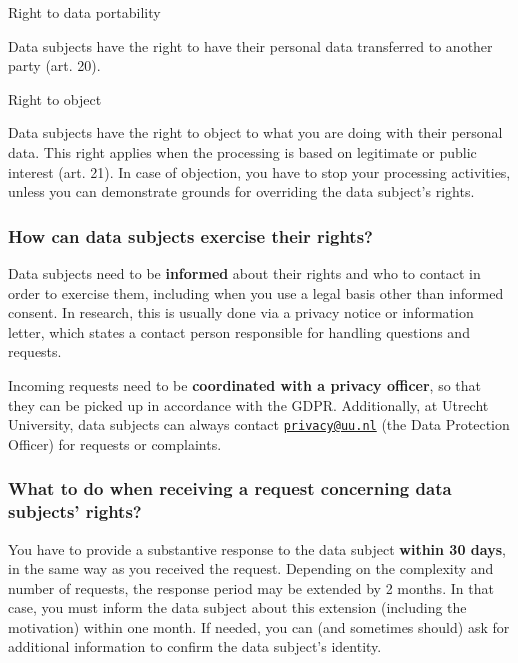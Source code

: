 \documentclass[
]{book}
\begin{document}
Right to data portability

Data subjects have the right to have their personal data transferred to
another party (art. 20).

Right to object

Data subjects have the right to object to what you are doing with their
personal data. This right applies when the processing is based on legitimate
or public interest (art. 21).
In case of objection, you have to stop your processing activities, unless
you can demonstrate grounds for overriding the data subject's rights.

\hypertarget{how-can-data-subjects-exercise-their-rights}{%
\subsubsection{How can data subjects exercise their rights?}\label{how-can-data-subjects-exercise-their-rights}}

Data subjects need to be \textbf{informed} about their rights and who to contact in
order to exercise them, including when you use a legal basis other than informed
consent. In research, this is usually done via a
privacy notice or information letter, which states
a contact person responsible for handling questions and requests.

Incoming requests need to be \textbf{coordinated with a privacy officer}, so that
they can be picked up in accordance with the GDPR. Additionally, at Utrecht
University, data subjects can always contact
\href{mailto:privacy@uu.nl}{\nolinkurl{privacy@uu.nl}} (the Data Protection Officer) for
requests or complaints.

\hypertarget{what-to-do-when-receiving-a-request-concerning-data-subjects-rights}{%
\subsubsection{What to do when receiving a request concerning data subjects' rights?}\label{what-to-do-when-receiving-a-request-concerning-data-subjects-rights}}

You have to provide a substantive response to the data subject \textbf{within 30 days},
in the same way as you received the request. Depending on the complexity and
number of requests, the response period may be extended by 2 months. In that
case, you must inform the data subject about this extension (including the
motivation) within one month. If needed, you can (and sometimes should) ask for
additional information to confirm the data subject's identity.
\end{document}
